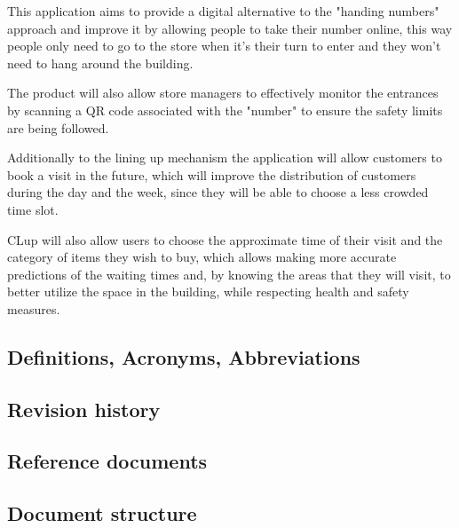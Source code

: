 This application aims to provide a digital alternative to the "handing numbers" approach and improve it by allowing people to take their number online, this way people only need to go to the store when it's their turn to enter and they won't need to hang around the building.

The product will also allow store managers to effectively monitor the entrances by scanning a QR code associated with the "number" to ensure the safety limits are being followed.

Additionally to the lining up mechanism the application will allow customers to book a visit in the future, which will improve the distribution of customers during the day and the week, since they will be able to choose a less crowded time slot.

CLup will also allow users to choose the approximate time of their visit and the category of items they wish to buy, which allows making more accurate predictions of the waiting times and, by knowing the areas that they will visit, to better utilize the space in the building, while respecting health and safety measures.
\subsection{Definitions, Acronyms, Abbreviations}
\subsection{Revision history}
\subsection{Reference documents}
\subsection{Document structure}
